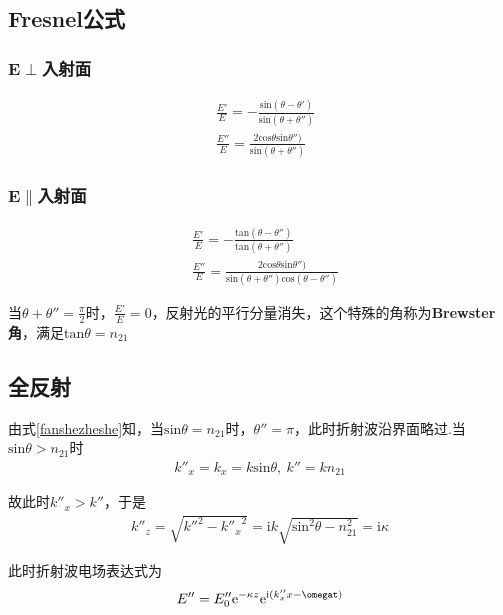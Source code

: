 \documentclass[main.tex]{subfiles}
\begin{document}
\subsection{Fresnel公式}

\subsubsection{$\boldsymbol{E} \perp $入射面}
\begin{align}
    &\frac{E'}{E} = -\frac{\mathrm{sin}(\theta - \theta ')}{\mathrm{sin}(\theta + \theta '')}\\
    &\frac{E''}{E} = \frac{2\mathrm{cos} \theta \mathrm{sin} \theta '')}{\mathrm{sin}(\theta + \theta '')}
\end{align}

\subsubsection{$\boldsymbol{E} \parallel $入射面}
\begin{align}
    &\frac{E'}{E} = -\frac{\mathrm{tan}(\theta - \theta '')}{\mathrm{tan}(\theta + \theta '')}\\
    &\frac{E''}{E} = \frac{2\mathrm{cos} \theta \mathrm{sin} \theta '')}{\mathrm{sin}(\theta + \theta '') \mathrm{cos}(\theta - \theta '')}
\end{align}

当$\theta + \theta '' = \frac{\pi}{2}$时，$\frac{E'}{E} = 0$，反射光的平行分量消失，这个特殊的角称为\textbf{Brewster角}，满足$\mathrm{tan}\theta = n_21$

\subsection{全反射}
由式\ref{fanshezheshe}知，当$\mathrm{sin}\theta = n_{21}$时，$\theta '' = \pi$，此时折射波沿界面略过.当$\mathrm{sin}\theta > n_{21}$时
\begin{align}
    k''_x = k_x = k\mathrm{sin}\theta ,\ k'' = kn_{21}
\end{align}

故此时$k''_x > k''$，于是
\begin{align}
    k''_z = \sqrt{{k''}^2 - {k''_x}^2} = \mathrm{i}k\sqrt{\mathrm{sin}^2\theta - n_{21}^2} = \mathrm{i}\kappa
\end{align}

此时折射波电场表达式为
\begin{align}
    E'' = E''_0\mathrm{e}^{-\kappa z}\mathrm{e}^{\mathrm{i}(k''_xx-\omegat)}
\end{align}
\end{document}
